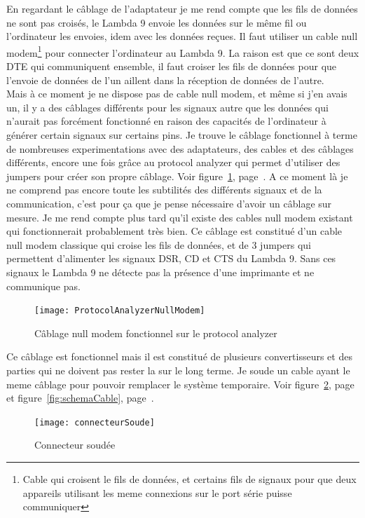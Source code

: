\documentclass[12pt]{article}
\begin{document}
En regardant le câblage de l'adaptateur je me rend compte que les fils de données ne sont pas croisés, le Lambda 9 envoie les données sur le même fil ou l'ordinateur les envoies, idem avec les données reçues.
Il faut utiliser un cable null modem\footnote{Cable qui croisent le fils de données, et certains fils de signaux pour que deux appareils utilisant les meme connexions sur le port série puisse communiquer} pour connecter l'ordinateur au Lambda 9.
La raison est que ce sont deux DTE qui communiquent ensemble, il faut croiser les fils de données pour que l'envoie de données de l'un aillent dans la réception de données de l'autre.\\
Mais à ce moment je ne dispose pas de cable null modem, et même si j'en avais un, il y a des câblages différents pour les signaux autre que les données qui n'aurait pas forcément fonctionné en raison des capacités de l'ordinateur à générer certain signaux sur certains pins.
Je trouve le câblage fonctionnel à terme de nombreuses experimentations avec des adaptateurs, des cables et des câblages différents, encore une fois grâce au protocol analyzer qui permet d'utiliser des jumpers pour créer son propre câblage.
Voir figure~\ref{fig:cablageProtocolAnalyzer}, page~\pageref{fig:cablageProtocolAnalyzer}.
A ce moment là je ne comprend pas encore toute les subtilités des différents signaux et de la communication, c'est pour ça que je pense nécessaire d'avoir un câblage sur mesure.
Je me rend compte plus tard qu'il existe des cables null modem existant qui fonctionnerait probablement très bien.
Ce câblage est constitué d'un cable null modem classique qui croise les fils de données, et de 3 jumpers qui permettent d'alimenter les signaux DSR, CD et CTS du Lambda 9.
Sans ces signaux le Lambda 9 ne détecte pas la présence d'une imprimante et ne communique pas.
\begin{figure}[H]
	\centering
	\texttt{[image: ProtocolAnalyzerNullModem]}
	\caption{Câblage null modem fonctionnel sur le protocol analyzer}
	\label{fig:cablageProtocolAnalyzer}
\end{figure}
Ce câblage est fonctionnel mais il est constitué de plusieurs convertisseurs et des parties qui ne doivent pas rester la sur le long terme.
Je soude un cable ayant le meme câblage pour pouvoir remplacer le système temporaire.
Voir figure~\ref{fig:connecteurSoudee}, page~\pageref{fig:connecteurSoudee} et figure~\ref{fig:schemaCable}, page~\pageref{fig:schemaCable}.
\begin{figure}[h]
	\centering
	\texttt{[image: connecteurSoude]}
	\caption{Connecteur soudée}
	\label{fig:connecteurSoudee}
\end{figure}
\end{document}
